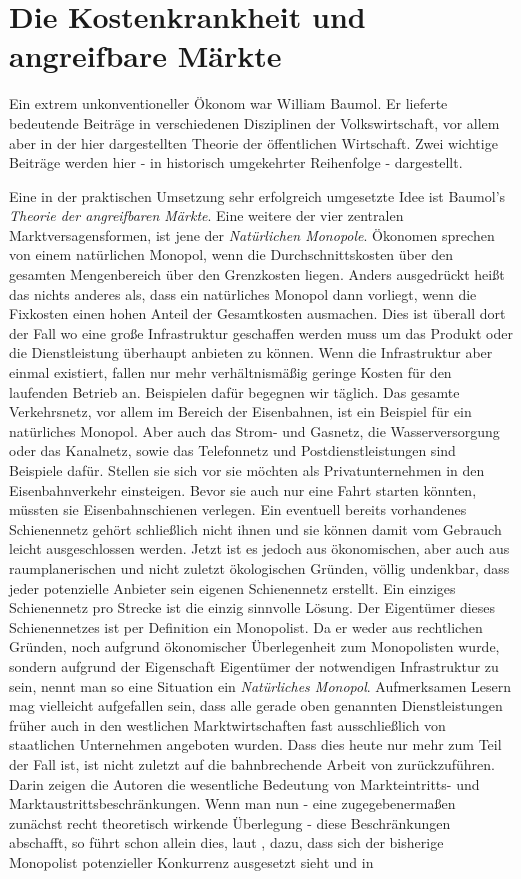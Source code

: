 \section{Die Kostenkrankheit und angreifbare Märkte}
\label{Disease}
Ein extrem unkonventioneller Ökonom war William Baumol. Er lieferte bedeutende Beiträge in verschiedenen Disziplinen der Volkswirtschaft, vor allem aber in der hier dargestellten Theorie der öffentlichen Wirtschaft. Zwei wichtige Beiträge werden hier - in historisch umgekehrter Reihenfolge - dargestellt.

Eine in der praktischen Umsetzung sehr erfolgreich umgesetzte Idee ist Baumol's \textit{Theorie der angreifbaren Märkte}. Eine weitere der vier zentralen Marktversagensformen, ist jene der \textit{Natürlichen Monopole}. Ökonomen sprechen von einem natürlichen Monopol, wenn die Durchschnittskosten über den gesamten Mengenbereich über den Grenzkosten liegen. Anders ausgedrückt heißt das nichts anderes als, dass ein natürliches Monopol dann vorliegt, wenn die Fixkosten einen hohen Anteil der Gesamtkosten ausmachen. Dies ist überall dort der Fall wo eine große Infrastruktur geschaffen werden muss um das Produkt oder die Dienstleistung überhaupt anbieten zu können. Wenn die Infrastruktur aber einmal existiert, fallen nur mehr verhältnismäßig geringe Kosten für den laufenden Betrieb an. Beispielen dafür begegnen wir täglich. Das gesamte Verkehrsnetz, vor allem im Bereich der Eisenbahnen, ist ein Beispiel für ein natürliches Monopol. Aber auch das Strom- und Gasnetz, die Wasserversorgung oder das Kanalnetz, sowie das Telefonnetz und Postdienstleistungen sind Beispiele dafür. Stellen sie sich vor sie möchten als Privatunternehmen in den Eisenbahnverkehr einsteigen. Bevor sie auch nur eine Fahrt starten könnten, müssten sie Eisenbahnschienen verlegen. Ein eventuell bereits vorhandenes Schienennetz gehört schließlich nicht ihnen und sie können damit vom Gebrauch leicht ausgeschlossen werden. Jetzt ist es jedoch aus ökonomischen, aber auch aus raumplanerischen und nicht zuletzt ökologischen Gründen, völlig undenkbar, dass jeder potenzielle Anbieter sein eigenen Schienennetz erstellt. Ein einziges Schienennetz pro Strecke ist die einzig sinnvolle Lösung. Der Eigentümer dieses Schienennetzes ist per Definition ein Monopolist. Da er weder aus rechtlichen Gründen, noch aufgrund ökonomischer Überlegenheit zum Monopolisten wurde, sondern aufgrund der Eigenschaft Eigentümer der notwendigen Infrastruktur zu sein, nennt man so eine Situation ein \textit{Natürliches Monopol}. Aufmerksamen Lesern mag vielleicht aufgefallen sein, dass alle gerade oben genannten Dienstleistungen früher auch in den westlichen Marktwirtschaften fast ausschließlich von staatlichen Unternehmen angeboten wurden. Dass dies heute nur mehr zum Teil der Fall ist, ist nicht zuletzt auf die bahnbrechende Arbeit von \textcite{Baumol1982, Baumol1982b} zurückzuführen. Darin zeigen die Autoren die wesentliche Bedeutung von Markteintritts- und Marktaustrittsbeschränkungen.  Wenn man nun - eine zugegebenermaßen zunächst recht theoretisch wirkende Überlegung - diese Beschränkungen abschafft, so führt schon allein dies, laut \textcite{Baumol1982}, dazu, dass sich der bisherige Monopolist potenzieller Konkurrenz ausgesetzt sieht und in 